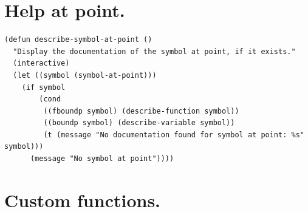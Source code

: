 \documentclass[11pt]{article}
\begin{document}
\section{Help at point.}
\label{sec:orgda0ff03}
\begin{verbatim}
(defun describe-symbol-at-point ()
  "Display the documentation of the symbol at point, if it exists."
  (interactive)
  (let ((symbol (symbol-at-point)))
    (if symbol
        (cond
         ((fboundp symbol) (describe-function symbol))
         ((boundp symbol) (describe-variable symbol))
         (t (message "No documentation found for symbol at point: %s" symbol)))
      (message "No symbol at point"))))
\end{verbatim}
\section{Custom functions.}
\label{sec:orge26144a}
\end{document}
